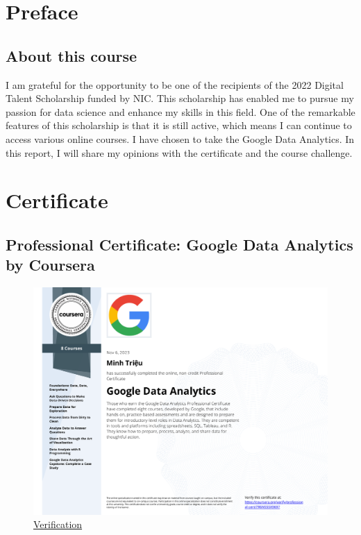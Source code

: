 \documentclass[]{article}
\begin{document}
\setlength{\parskip}{.7em}
\tableofcontents
\newpage

\setlength{\parskip}{.5em}
\newpage


\section{Preface}
\subsection{About this course}
I am grateful for the opportunity to be one of the recipients of the 2022 Digital Talent Scholarship funded by NIC. This scholarship has enabled me to pursue my passion for data science and enhance my skills in this field. One of the remarkable features of this scholarship is that it is still active, which means I can continue to access various online courses. I have chosen to take the Google Data Analytics. In this report, I will share my opinions with the certificate and the course challenge.
\section{Certificate}
\subsection{Professional Certificate: Google Data Analytics by Coursera}
\begin{figure}[ht!]
  \includegraphics[width=\textwidth]{certs/7R6NS55X9697.pdf}
  \caption{\href{https://www.coursera.org/account/accomplishments/specialization/certificate/7R6NS55X9697}{Verification}}
\end{figure}
\end{document}
